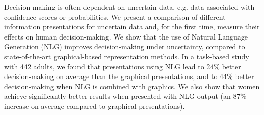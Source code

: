 Decision-making is often dependent on uncertain data, e.g. data associated with confidence scores or  probabilities. We present a  comparison of different information presentations for uncertain data and, for the first time, measure their effects on human decision-making. We show that the use of Natural Language Generation (NLG) improves decision-making under uncertainty, compared to              state-of-the-art graphical-based representation methods. In a task-based study with 442 adults, we found that  presentations using NLG lead to 24\% better decision-making on average than the graphical presentations, and to 44\% better decision-making when NLG is combined with graphics. We also show that women achieve significantly better results when   presented with NLG output (an  87\% increase on average compared to graphical presentations).
